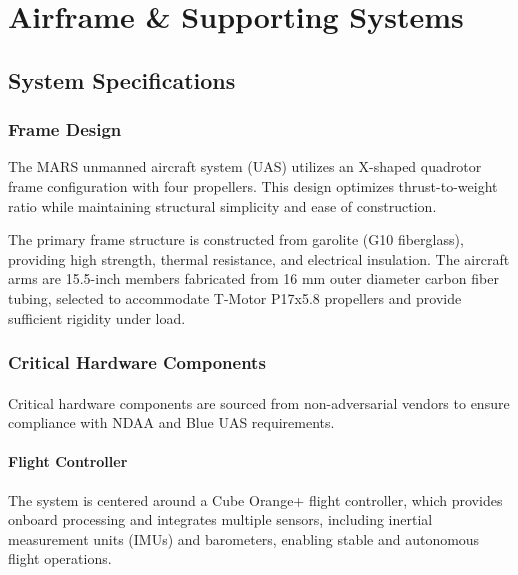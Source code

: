 \chapter{Airframe \& Supporting Systems}
\label{ch:airframe}



\section{System Specifications}\label{sec:systemspecs}
    \subsection{Frame Design}
        The MARS unmanned aircraft system (UAS) utilizes an X-shaped quadrotor frame configuration with four propellers. This design optimizes thrust-to-weight ratio while maintaining structural simplicity and ease of construction.
        
        The primary frame structure is constructed from garolite (G10 fiberglass), providing high strength, thermal resistance, and electrical insulation. The aircraft arms are 15.5-inch members fabricated from 16 mm outer diameter carbon fiber tubing, selected to accommodate T-Motor P17x5.8 propellers and provide sufficient rigidity under load.
        
    \subsection{Critical Hardware Components}
    \subsubsection{} Critical hardware components are sourced from non-adversarial vendors to ensure compliance with NDAA and Blue UAS requirements.
    
    \subsubsection{Flight Controller} The system is centered around a Cube Orange+ flight controller, which provides onboard processing and integrates multiple sensors, including inertial measurement units (IMUs) and barometers, enabling stable and autonomous flight operations.
    
